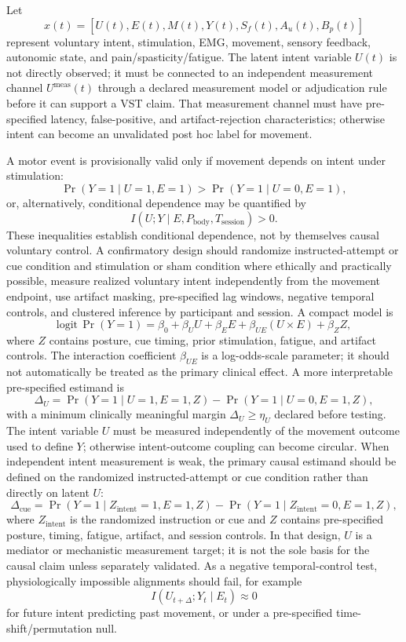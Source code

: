 \documentclass[11pt,a4paper]{article}
\newcommand{\1}{\mathbf{1}}
\begin{document}
Let
\[
  x(t)=[U(t),E(t),M(t),Y(t),S_f(t),A_u(t),B_p(t)]
\]
represent voluntary intent, stimulation, EMG, movement, sensory feedback, autonomic state, and pain/spasticity/fatigue. The latent intent variable $U(t)$ is not directly observed; it must be connected to an independent measurement channel $U^{\mathrm{meas}}(t)$ through a declared measurement model or adjudication rule before it can support a VST claim. That measurement channel must have pre-specified latency, false-positive, and artifact-rejection characteristics; otherwise intent can become an unvalidated post hoc label for movement.

A motor event is provisionally valid only if movement depends on intent under stimulation:
\[
  \Pr(Y=1\mid U=1,E=1)>\Pr(Y=1\mid U=0,E=1),
\]
or, alternatively, conditional dependence may be quantified by
\[
  I(U;Y\mid E,P_{\mathrm{body}},T_{\mathrm{session}})>0.
\]
These inequalities establish conditional dependence, not by themselves causal voluntary control. A confirmatory design should randomize instructed-attempt or cue condition and stimulation or sham condition where ethically and practically possible, measure realized voluntary intent independently from the movement endpoint, use artifact masking, pre-specified lag windows, negative temporal controls, and clustered inference by participant and session. A compact model is
\[
  \mathrm{logit}\,\Pr(Y=1)
  =
  \beta_0+\beta_U U+\beta_E E+\beta_{UE}(U\times E)+\beta_Z Z,
\]
where $Z$ contains posture, cue timing, prior stimulation, fatigue, and artifact controls.
The interaction coefficient $\beta_{UE}$ is a log-odds-scale parameter; it should not automatically be treated as the primary clinical effect. A more interpretable pre-specified estimand is
\[
  \Delta_U=
  \Pr(Y=1\mid U=1,E=1,Z)-\Pr(Y=1\mid U=0,E=1,Z),
\]
with a minimum clinically meaningful margin $\Delta_U\geq\eta_U$ declared before testing. The intent variable $U$ must be measured independently of the movement outcome used to define $Y$; otherwise intent-outcome coupling can become circular.
When independent intent measurement is weak, the primary causal estimand should be defined on the randomized instructed-attempt or cue condition rather than directly on latent $U$:
\[
  \Delta_{\mathrm{cue}}=
  \Pr(Y=1\mid Z_{\mathrm{intent}}=1,E=1,Z)
  -
  \Pr(Y=1\mid Z_{\mathrm{intent}}=0,E=1,Z),
\]
where $Z_{\mathrm{intent}}$ is the randomized instruction or cue and $Z$ contains pre-specified posture, timing, fatigue, artifact, and session controls. In that design, $U$ is a mediator or mechanistic measurement target; it is not the sole basis for the causal claim unless separately validated.
As a negative temporal-control test, physiologically impossible alignments should fail, for example
\[
  I(U_{t+\Delta};Y_t\mid E_t)\approx 0
\]
for future intent predicting past movement, or under a pre-specified time-shift/permutation null.
\end{document}
